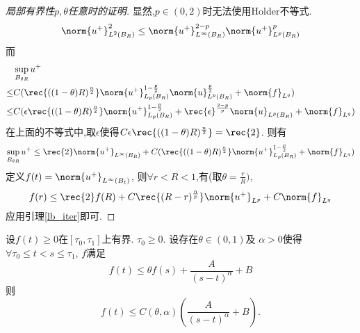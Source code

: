 \begin{proof}[局部有界性$p,\theta$任意时的证明]
    显然,$p \in (0,2)$时无法使用Holder不等式.
    \begin{equation}
        \norm{u^+}^2_{L^2(B_R)} \le \norm{u^+}^{2-p}_{L^\infty(B_R)} \norm{u^+}^p_{L^p(B_R)}
    \end{equation}
    而
    \begin{equation}
        \begin{split}
            &\sup_{B_{\theta R}}u^+  \\
            \le & C(\rec{((1-\theta)R)^\frac{n}{2}} \norm{u^+}^{1-\frac{p}{2}}_{L_p(B_R)}\norm{u}_{L^p(B_R)}^\frac{p}{2}+\norm{f}_{L^q}) \\
            \le & C(\epsilon\rec{((1-\theta)R)^\frac{n}{2}} \norm{u^+}^{1-\frac{p}{2}}_{L_p(B_R)}+\rec{\epsilon}^\frac{2-p}{p}\norm{u}_{L^p(B_R)}+\norm{f}_{L^q}) 
        \end{split}
    \end{equation}
    在上面的不等式中,取$\epsilon$使得$C\epsilon\rec{((1-\theta)R)^\frac{n}{2}}=\rec{2}$. 则有
    \begin{equation}
        \sup_{B_{\theta R}}u^+ \le \rec{2}\norm{u^+}_{L^\infty(B_R)}+ C(\rec{((1-\theta)R)^\frac{n}{2}} \norm{u^+}^{1-\frac{p}{2}}_{L_p(B_R)}+\norm{f}_{L^q}) 
    \end{equation}
    定义$f(t)=\norm{u^+}_{L^\infty(B_t)}$, 则$\forall r < R <1$,有(取$\theta=\frac{r}{R})$,
    \begin{equation}
        f(r) \le \rec{2}f(R)+C\rec{(R-r)^\frac{n}{p}}\norm{u^+}_{L^p}+C\norm{f}_{L^q}
    \end{equation}
    应用引理\eqref{lb_iter}即可.
\end{proof}
\begin{lemma} \label{lb_iter}
    设$f(t) \ge 0$在$[\tau_0,\tau_1]$上有界. $\tau_0 \ge 0$. 设存在$\theta \in (0,1)$及 $\alpha >0$使得$\forall \tau_0 \le t < s \le \tau_1$, $f$满足
    \begin{equation}
        f(t) \le \theta f(s) + \frac{A}{(s-t)^\alpha}+B
    \end{equation}
    则
    \begin{equation}
        f(t) \le C(\theta,\alpha)(\frac{A}{(s-t)^\alpha}+B).
    \end{equation}
\end{lemma}

